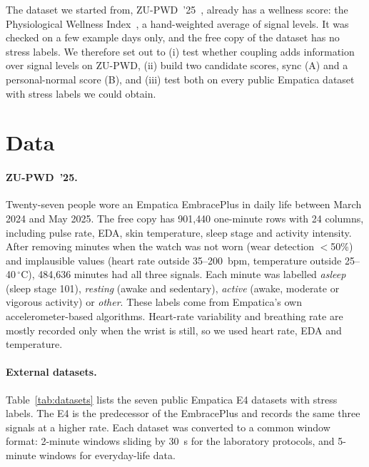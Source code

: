 \documentclass{article}
\begin{document}
The dataset we started from, ZU-PWD~'25~\cite{evangelista2025zupwd}, already has a wellness score: the Physiological Wellness Index~\cite{sharma2025pwi}, a hand-weighted average of signal levels. It was checked on a few example days only, and the free copy of the dataset has no stress labels. We therefore set out to (i) test whether coupling adds information over signal levels on ZU-PWD, (ii) build two candidate scores, sync (A) and a personal-normal score (B), and (iii) test both on every public Empatica dataset with stress labels we could obtain.

\section{Data}

\paragraph{ZU-PWD~'25.} Twenty-seven people wore an Empatica EmbracePlus in daily life between March 2024 and May 2025. The free copy has 901{,}440 one-minute rows with 24 columns, including pulse rate, EDA, skin temperature, sleep stage and activity intensity. After removing minutes when the watch was not worn (wear detection $<$50\%) and implausible values (heart rate outside 35--200~bpm, temperature outside 25--40\,$^\circ$C), 484{,}636 minutes had all three signals. Each minute was labelled \emph{asleep} (sleep stage 101), \emph{resting} (awake and sedentary), \emph{active} (awake, moderate or vigorous activity) or \emph{other}. These labels come from Empatica's own accelerometer-based algorithms. Heart-rate variability and breathing rate are mostly recorded only when the wrist is still, so we used heart rate, EDA and temperature.

\paragraph{External datasets.} Table~\ref{tab:datasets} lists the seven public Empatica E4 datasets with stress labels. The E4 is the predecessor of the EmbracePlus and records the same three signals at a higher rate. Each dataset was converted to a common window format: 2-minute windows sliding by 30~s for the laboratory protocols, and 5-minute windows for everyday-life data.
\end{document}
